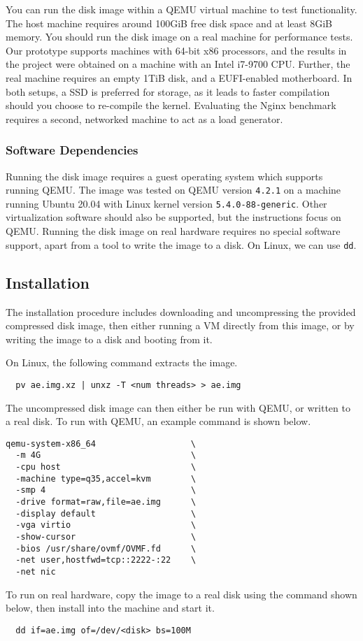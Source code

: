You can run the disk image within a QEMU virtual machine to test
functionality.
The host machine requires around 100GiB free disk space and at least
8GiB memory.
You should run the disk image on a real machine for performance
tests.
Our \midas{} prototype supports machines with 64-bit x86 processors, 
and the results in the project were obtained on a machine with an 
Intel i7-9700 CPU.
Further, the real machine requires an empty 1TiB disk, and a 
EUFI-enabled motherboard.
In both setups, a SSD is preferred for storage, as it leads to
faster compilation should you choose to re-compile the kernel.
Evaluating the Nginx benchmark requires a second, networked machine
to act as a load generator.

\subsubsection{Software Dependencies}

Running the \midas{} disk image requires a guest operating system
which supports running QEMU.
The image was tested on QEMU version \texttt{4.2.1} on a machine running
Ubuntu 20.04 with Linux kernel version \texttt{5.4.0-88-generic}.
Other virtualization software should also be supported, but the 
instructions focus on QEMU.
Running the disk image on real hardware requires no special software 
support, apart from a tool to write the image to a disk.
On Linux, we can use \texttt{dd}.

\subsection{Installation}

The installation procedure includes downloading and uncompressing 
the provided compressed disk image, then either running a VM directly
from this image, or by writing the image to a disk and booting from it.

On Linux, the following command extracts the image.
\begin{verbatim}
  pv ae.img.xz | unxz -T <num threads> > ae.img
\end{verbatim}
The uncompressed disk image can then either be run with QEMU, or 
written to a real disk.
To run with QEMU, an example command is shown below.
\begin{verbatim}
qemu-system-x86_64                   \
  -m 4G                              \
  -cpu host                          \
  -machine type=q35,accel=kvm        \
  -smp 4                             \
  -drive format=raw,file=ae.img      \
  -display default                   \
  -vga virtio                        \
  -show-cursor                       \
  -bios /usr/share/ovmf/OVMF.fd      \
  -net user,hostfwd=tcp::2222-:22    \
  -net nic
\end{verbatim}
To run on real hardware, copy the image to a real disk using the 
command shown below, then install into the machine and start it.
\begin{verbatim}
  dd if=ae.img of=/dev/<disk> bs=100M
\end{verbatim}

